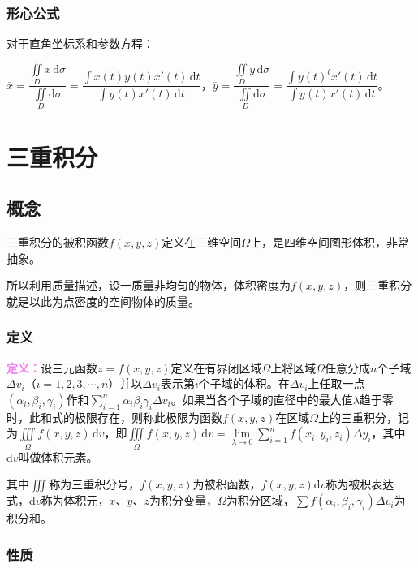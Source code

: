 \documentclass[UTF8, 12pt]{ctexart}
\begin{document}
\subsubsection{形心公式}

对于直角坐标系和参数方程：

$\overline{x}=\dfrac{\iint\limits_Dx\,\textrm{d}\sigma}{\iint\limits_D\textrm{d}\sigma}=\dfrac{\int x(t)y(t)x'(t)\,\textrm{d}t}{\int y(t)x'(t)\,\textrm{d}t}$，$\overline{y}=\dfrac{\iint\limits_Dy\,\textrm{d}\sigma}{\iint\limits_D\textrm{d}\sigma}=\dfrac{\int y(t)^tx'(t)\,\textrm{d}t}{\int y(t)x'(t)\,\textrm{d}t}$。

\section{三重积分}

\subsection{概念}

三重积分的被积函数$f(x,y,z)$定义在三维空间$\Omega$上，是四维空间图形体积，非常抽象。

所以利用质量描述，设一质量非均匀的物体，体积密度为$f(x,y,z)$，则三重积分就是以此为点密度的空间物体的质量。

\subsubsection{定义}

\textcolor{violet}{\textbf{定义：}}设三元函数$z=f(x,y,z)$定义在有界闭区域$\Omega$上将区域$\Omega$任意分成$n$个子域$\Delta v_i$（$i=1,2,3,\cdots,n$）并以$\Delta v_i$表示第$i$个子域的体积。在$\Delta v_i$上任取一点$(\alpha_i,\beta_i,\gamma_i)$作和$\sum\limits_{i=1}^n\alpha_i\beta_i\gamma_i\Delta v_i$。如果当各个子域的直径中的最大值$\lambda$趋于零时，此和式的极限存在，则称此极限为函数$f(x,y,z)$在区域$\Omega$上的三重积分，记为$\iiint\limits_\Omega f(x,y,z)\,\textrm{d}v$，即$\iiint\limits_\Omega f(x,y,z)\,\textrm{d}v=\lim\limits_{\lambda\to0}\sum\limits_{i=1}^nf(x_i,y_i,z_i)\Delta y_i$，其中$\textrm{d}v$叫做体积元素。

其中$\iiint$称为三重积分号，$f(x,y,z)$为被积函数，$f(x,y,z)\textrm{d}v$称为被积表达式，$\textrm{d}v$称为体积元，$x$、$y$、$z$为积分变量，$\Omega$为积分区域，$\sum f(\alpha_i,\beta_i,\gamma_i)\Delta v_i$为积分和。

\subsubsection{性质}
\end{document}
